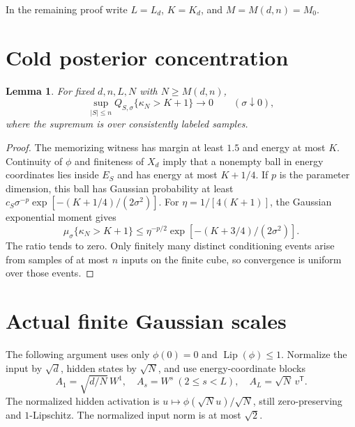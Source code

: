 \documentclass[11pt]{article}
\newtheorem{lemma}[theorem]{Lemma}
\theoremstyle{remark}\newtheorem{remark}[theorem]{Remark}
\newcommand{\Lip}{\operatorname{Lip}}
\begin{document}
In the remaining proof write $L=L_d$, $K=K_d$, and $M=M(d,n)=M_0$.
\section{Cold posterior concentration}
\begin{lemma}\label{lem:cold}
For fixed $d,n,L,N$ with $N\ge M(d,n)$,
\[
 \sup_{|S|\le n}Q_{S,\sigma}\{\kappa_N>K+1\}\longrightarrow0
 \qquad(\sigma\downarrow0),
\]
where the supremum is over consistently labeled samples.
\end{lemma}
\begin{proof}
The memorizing witness has margin at least $1.5$ and energy at most $K$.
Continuity of $\phi$ and finiteness of $X_d$ imply that a nonempty
ball in energy coordinates lies inside $E_S$ and has energy at
most $K+1/4$. If $p$ is the parameter dimension, this ball has
Gaussian probability at least
$c_S\sigma^{-p}\exp[-(K+1/4)/(2\sigma^2)]$.
For $\eta=1/[4(K+1)]$, the Gaussian exponential moment gives
\[
 \mu_\sigma\{\kappa_N>K+1\}
 \le\eta^{-p/2}\exp[-(K+3/4)/(2\sigma^2)].
\]
The ratio tends to zero. Only finitely many distinct conditioning
events arise from samples of at most $n$ inputs on the finite
cube, so convergence is uniform over those events.
\end{proof}

\section{Actual finite Gaussian scales}
The following argument uses only $\phi(0)=0$ and
$\Lip(\phi)\le1$. Normalize the input by $\sqrt d$, hidden states
by $\sqrt N$, and use energy-coordinate blocks
\[
 A_1=\sqrt{d/N}\,W^1,\quad A_s=W^s\ (2\le s<L),\quad
 A_L=\sqrt N\,v^{\mathsf T}.
\]
The normalized hidden activation is
$u\mapsto\phi(\sqrt N u)/\sqrt N$, still zero-preserving and
$1$-Lipschitz. The normalized input norm is at most $\sqrt2$.
\end{document}
